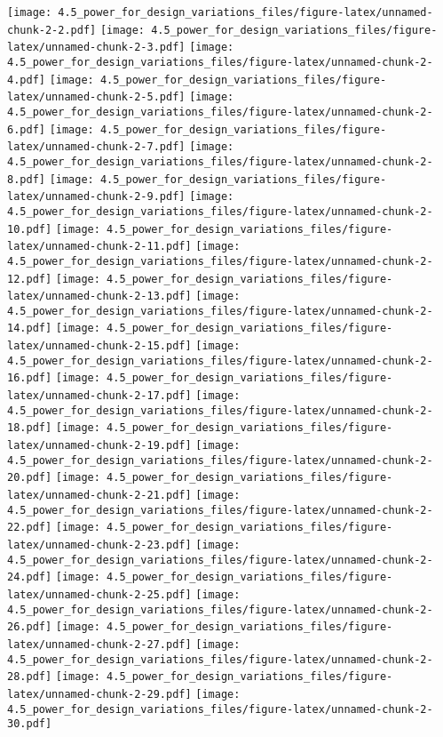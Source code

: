 \documentclass[]{article}
\begin{document}
\texttt{[image: 4.5\_power\_for\_design\_variations\_files/figure-latex/unnamed-chunk-2-2.pdf]}
\texttt{[image: 4.5\_power\_for\_design\_variations\_files/figure-latex/unnamed-chunk-2-3.pdf]}
\texttt{[image: 4.5\_power\_for\_design\_variations\_files/figure-latex/unnamed-chunk-2-4.pdf]}
\texttt{[image: 4.5\_power\_for\_design\_variations\_files/figure-latex/unnamed-chunk-2-5.pdf]}
\texttt{[image: 4.5\_power\_for\_design\_variations\_files/figure-latex/unnamed-chunk-2-6.pdf]}
\texttt{[image: 4.5\_power\_for\_design\_variations\_files/figure-latex/unnamed-chunk-2-7.pdf]}
\texttt{[image: 4.5\_power\_for\_design\_variations\_files/figure-latex/unnamed-chunk-2-8.pdf]}
\texttt{[image: 4.5\_power\_for\_design\_variations\_files/figure-latex/unnamed-chunk-2-9.pdf]}
\texttt{[image: 4.5\_power\_for\_design\_variations\_files/figure-latex/unnamed-chunk-2-10.pdf]}
\texttt{[image: 4.5\_power\_for\_design\_variations\_files/figure-latex/unnamed-chunk-2-11.pdf]}
\texttt{[image: 4.5\_power\_for\_design\_variations\_files/figure-latex/unnamed-chunk-2-12.pdf]}
\texttt{[image: 4.5\_power\_for\_design\_variations\_files/figure-latex/unnamed-chunk-2-13.pdf]}
\texttt{[image: 4.5\_power\_for\_design\_variations\_files/figure-latex/unnamed-chunk-2-14.pdf]}
\texttt{[image: 4.5\_power\_for\_design\_variations\_files/figure-latex/unnamed-chunk-2-15.pdf]}
\texttt{[image: 4.5\_power\_for\_design\_variations\_files/figure-latex/unnamed-chunk-2-16.pdf]}
\texttt{[image: 4.5\_power\_for\_design\_variations\_files/figure-latex/unnamed-chunk-2-17.pdf]}
\texttt{[image: 4.5\_power\_for\_design\_variations\_files/figure-latex/unnamed-chunk-2-18.pdf]}
\texttt{[image: 4.5\_power\_for\_design\_variations\_files/figure-latex/unnamed-chunk-2-19.pdf]}
\texttt{[image: 4.5\_power\_for\_design\_variations\_files/figure-latex/unnamed-chunk-2-20.pdf]}
\texttt{[image: 4.5\_power\_for\_design\_variations\_files/figure-latex/unnamed-chunk-2-21.pdf]}
\texttt{[image: 4.5\_power\_for\_design\_variations\_files/figure-latex/unnamed-chunk-2-22.pdf]}
\texttt{[image: 4.5\_power\_for\_design\_variations\_files/figure-latex/unnamed-chunk-2-23.pdf]}
\texttt{[image: 4.5\_power\_for\_design\_variations\_files/figure-latex/unnamed-chunk-2-24.pdf]}
\texttt{[image: 4.5\_power\_for\_design\_variations\_files/figure-latex/unnamed-chunk-2-25.pdf]}
\texttt{[image: 4.5\_power\_for\_design\_variations\_files/figure-latex/unnamed-chunk-2-26.pdf]}
\texttt{[image: 4.5\_power\_for\_design\_variations\_files/figure-latex/unnamed-chunk-2-27.pdf]}
\texttt{[image: 4.5\_power\_for\_design\_variations\_files/figure-latex/unnamed-chunk-2-28.pdf]}
\texttt{[image: 4.5\_power\_for\_design\_variations\_files/figure-latex/unnamed-chunk-2-29.pdf]}
\texttt{[image: 4.5\_power\_for\_design\_variations\_files/figure-latex/unnamed-chunk-2-30.pdf]}
\end{document}
